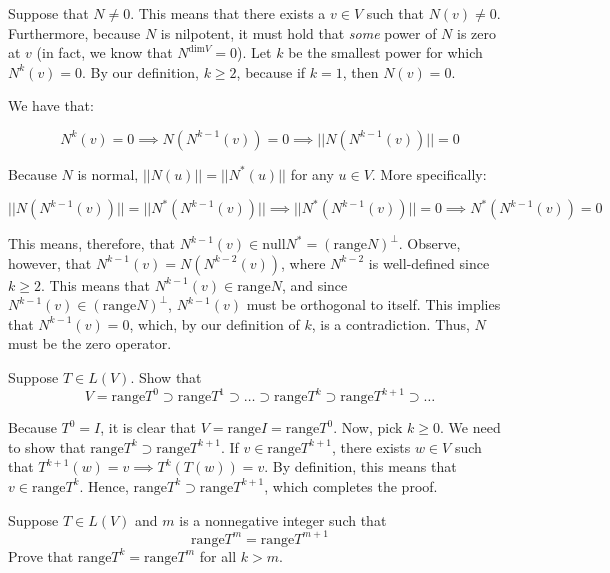 \begin{solution}

    Suppose that $N \neq 0$. This means that there exists a $v \in V$ such that $N(v)\neq 0$. Furthermore, because $N$ is nilpotent, it must hold that \textit{some} power of $N$ is zero at $v$ (in fact, we know that $N^{\text{dim}V}=0$). Let $k$ be the smallest power for which $N^{k}(v)=0$. By our definition, $k \geq 2$, because if $k=1$, then $N(v)=0$.

    We have that:

    $$N^k(v) = 0 \implies N(N^{k-1}(v)) = 0 \implies \lvert \lvert N(N^{k-1}(v)) \rvert \rvert = 0$$

    Because $N$ is normal, $\lvert \lvert N(u) \rvert \rvert = \lvert \lvert N^*(u) \rvert \rvert$ for any $u \in V$. More specifically:

    $$\lvert \lvert N(N^{k-1}(v)) \rvert \rvert = \lvert \lvert N^*(N^{k-1}(v)) \rvert \rvert \implies \lvert \lvert N^*(N^{k-1}(v)) \rvert \rvert = 0 \implies N^*(N^{k-1}(v)) = 0$$

    This means, therefore, that $N^{k-1}(v) \in \text{null} N^* = (\text{range} N)^\bot$. Observe, however, that $N^{k-1}(v) = N(N^{k-2}(v))$, where $N^{k-2}$ is well-defined since $k \geq 2$. This means that $N^{k-1}(v) \in \text{range} N$, and since $N^{k-1}(v) \in (\text{range} N)^\bot$, $N^{k-1}(v)$ must be orthogonal to itself. This implies that $N^{k-1}(v) = 0$, which, by our definition of $k$, is a contradiction. Thus, $N$ must be the zero operator.
\end{solution}

\begin{exercise}{16}
    Suppose $T \in L(V)$. Show that
    $$V = \text{range} T^0 \supset \text{range} T^1 \supset \ldots \supset \text{range} T^k \supset \text{range} T^{k+1} \supset \ldots$$
\end{exercise}

\begin{solution}

    Because $T^0=I$, it is clear that $V = \text{range} I = \text{range} T^0$. Now, pick $k \geq 0$. We need to show that $\text{range} T^k \supset \text{range} T^{k+1}$. If $v \in \text{range} T^{k+1}$, there exists $w \in V$ such that $T^{k+1}(w) = v \implies T^k(T(w)) = v$. By definition, this means that $v \in \text{range} T^k$. Hence, $\text{range} T^k \supset \text{range} T^{k+1}$, which completes the proof.
\end{solution}

\begin{exercise}{17}
    Suppose $T \in L(V)$ and $m$ is a nonnegative integer such that
    $$\text{range} T^m = \text{range} T^{m+1}$$
    Prove that $\text{range} T^k = \text{range} T^m$ for all $k > m$.
\end{exercise}

